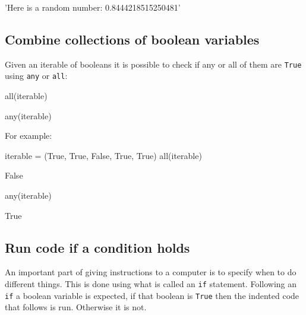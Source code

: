 \begin{raw}
'Here is a random number: 0.8444218515250481'
\end{raw}

\subsection{Combine collections of boolean variables}
\label{\detokenize{building-tools/01-variables-conditionals-loops/how/main:how-to-combine-collections-of-boolean-of-variables}}

Given an iterable of booleans it is possible to check if any or all of them are
\texttt{True} using \texttt{any} or \texttt{all}:


\begin{api}
all(iterable)
\end{api}



\begin{api}
any(iterable)
\end{api}



For example:




\begin{pyin}
iterable = (True, True, False, True, True)
all(iterable)
\end{pyin}





\begin{raw}
False
\end{raw}







\begin{pyin}
any(iterable)
\end{pyin}





\begin{raw}
True
\end{raw}





\subsection{Run code \textbf{if} a condition holds}

An important part of giving instructions to a computer is to specify when to do
different things.
This is done using what is called an \texttt{if} statement. Following an \texttt{if} a boolean
variable is expected, if that boolean is \texttt{True} then the indented code that
follows is run. Otherwise it is not.


